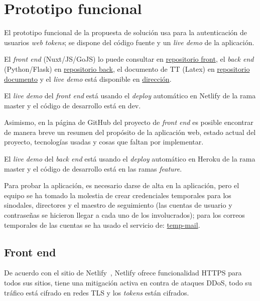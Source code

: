 \section{Prototipo funcional}\label{ref:prototipo}

El prototipo funcional de la propuesta de solución usa para la autenticación de usuarios \textit{web tokens}; se dispone del código fuente y un \textit{live demo} de la aplicación.


El \textit{front end} (Nuxt/JS/GoJS) lo puede consultar en \href{https://github.com/martinez-acosta/TT-2019-B052}{repositorio front}, el \textit{back end} (Python/Flask) en \href{https://github.com/omaraparicio07/api-tt-2019-b052}{repositorio back}, el documento de TT (Latex) en \href{https://github.com/martinez-acosta/DOCS-TT-2019-B052}{repositorio documento} y el \textit{live demo} está disponible en \href{https://serene-haibt-2239b4.netlify.app/}{dirección}.


El \textit{live demo} del \textit{front end} está usando el \textit{deploy} automático en Netlify de la rama master y el código de desarrollo está en dev.


Asimismo, en la página de GitHub del proyecto de \textit{front end} es posible encontrar de manera breve un resumen del propósito de la aplicación web, estado actual del proyecto, tecnologías usadas y cosas que faltan por implementar.


El \textit{live demo} del \textit{back end} está usando el \textit{deploy} automático en Heroku de la rama master y el código de desarrollo está en las ramas \textit{feature}.


Para probar la aplicación, es necesario darse de alta en la aplicación, pero el equipo se ha tomado la molestia de crear credenciales temporales para los sinodales, directores y el maestro de seguimiento (las cuentas de usuario y contraseñas se hicieron llegar a cada uno de los involucrados); para los correos temporales de las cuentas se ha usado el servicio de: \href{https://temp-mail.org/es/}{temp-mail}.

\subsection*{Front end}

De acuerdo con el sitio de Netlify~\cite{netlify_netlify_nodate}, Netlify ofrece funcionalidad HTTPS para todos sus sitios, tiene una mitigación activa en contra de ataques DDoS, todo su tráfico está cifrado en redes TLS y los \textit{tokens} están cifrados.

